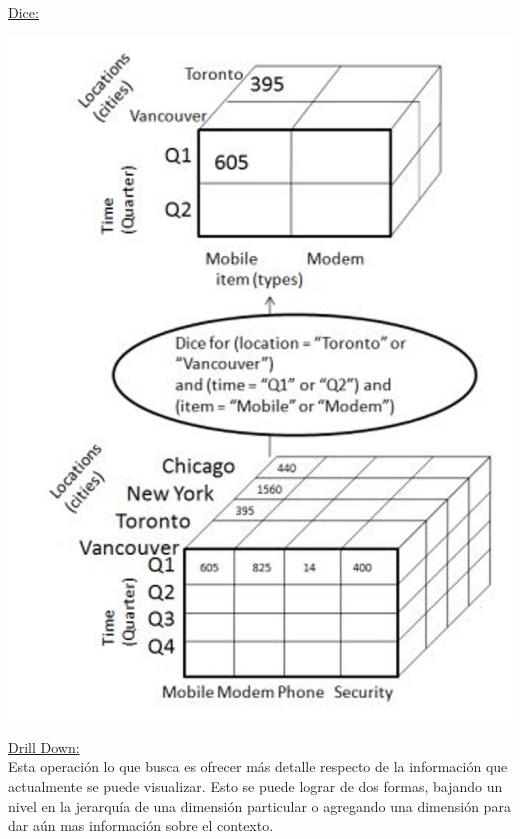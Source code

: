 \documentclass{fancyslides}
\begin{document}
\begin{frame}
\misc
{
  \underline{Dice:}
  \begin{center}
  \includegraphics[scale=0.15]{dice}
  \end{center}
}
\end{frame}


\begin{frame}
\misc
{
  \underline{Drill Down:}\\
Esta operación lo que busca es ofrecer más detalle respecto de la información que actualmente se puede visualizar. Esto se puede lograr de dos formas, bajando un nivel en la jerarquía de una dimensión particular o agregando una dimensión para dar aún mas información sobre el contexto.
}
\end{frame}
\end{document}
